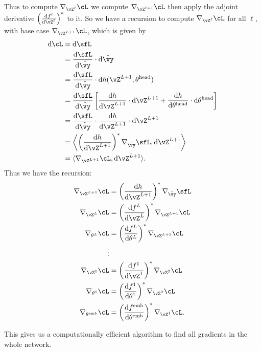 \documentclass[../../book-main.tex]{subfiles}
\begin{document}
Thus to compute \(\nabla_{\vZ^{\ell}}\cL\) we compute \(\nabla_{\vZ^{\ell + 1}}\cL\) then apply the adjoint derivative \(\bp{\odv{f^{\ell}}{\vZ^{\ell}}}^{*}\) to it. So we have a recursion to compute \(\nabla_{\vZ^{\ell}}\cL\) for all \(\ell\), with base case \(\nabla_{\vZ^{L + 1}}\cL\), which is given by 
\begin{align}
    \odif{\cL}
    &= \odif{\sfL} \\
    &= \odv{\sfL}{\hat{\vy}}\cdot\odif{\hat{\vy}} \\
    &= \odv{\sfL}{\hat{\vy}}\cdot\odif{{h(\vZ^{L + 1}, \theta^{\head})}} \\ 
    &= \odv{\sfL}{\hat{\vy}}\bs{\odv{h}{\vZ^{L + 1}}\cdot\odif{\vZ}^{L + 1} + \odv{h}{\theta^{\head}}\cdot\odif{\theta}^{\head}} \\ 
    &= \odv{\sfL}{\hat{\vy}}\cdot \odv{h}{\vZ^{L + 1}}\cdot\odif{\vZ}^{L + 1} \\ 
    &= \ip*{\bp{\odv{h}{\vZ^{L + 1}}}^{*}\nabla_{\hat{\vy}}\sfL}{\odif{\vZ}^{L + 1}} \\ 
    &= \ip{\nabla_{\vZ^{L + 1}}\cL}{\odif{\vZ}^{L + 1}}.
\end{align}
Thus we have the recursion:
\begin{align}
    \nabla_{\vZ^{L + 1}}\cL 
    &= \bp{\odv{h}{\vZ^{L + 1}}}^{*}\nabla_{\hat{\vy}}\sfL \\ 
    \nabla_{\vZ^{L}}\cL 
    &= \bp{\odv{f^{L}}{\vZ^{L}}}^{*}\nabla_{\vZ^{L + 1}}\cL \\ 
    \nabla_{\theta^{L}}\cL
    &= \bp{\odv{f^{L}}{\theta^{L}}}^{*}\nabla_{\vZ^{L + 1}}\cL \\
    \vdots &  \\ 
    \nabla_{\vZ^{1}}\cL 
    &= \bp{\odv{f^{1}}{\vZ^{1}}}^{*}\nabla_{\vZ^{2}}\cL \\ 
    \nabla_{\theta^{1}}\cL 
    &= \bp{\odv{f^{1}}{\theta^{1}}}^{*}\nabla_{\vZ^{2}}\cL \\ 
    \nabla_{\theta^{\emb}}\cL 
    &= \bp{\odv{f^{\emb}}{\theta^{\emb}}}^{*}\nabla_{\vZ^{1}}\cL.
\end{align}

This gives us a computationally efficient algorithm to find all gradients in the whole network.
\end{document}
